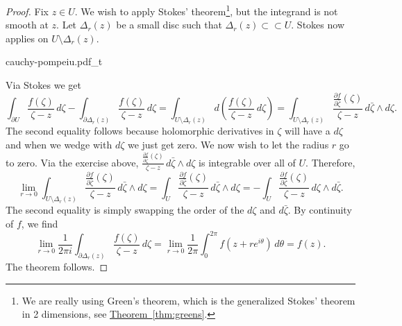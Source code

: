 \documentclass[12pt,openany]{book}
\theoremstyle{plain}
\theoremstyle{remark}
\theoremstyle{definition}
\newenvironment{myfig}{%
    \begin{center}
}{%
    \end{center}
}
\theoremstyle{exercise}
\theoremstyle{example}
\newcommand{\thmref}[1]{\hyperref[#1]{Theorem~\ref*{#1}}}
\begin{document}
\begin{proof}
Fix $z \in U$.  We wish to apply Stokes' theorem\footnote{%
We are really using Green's theorem, which is the generalized
Stokes' theorem in 2 dimensions, see \thmref{thm:greens}.},
but the integrand is not smooth at $z$.
Let $\Delta_r(z)$ be a small disc such that
$\Delta_r(z) \subset
\subset U$.  Stokes now applies on $U \setminus \Delta_r(z)$.

\begin{myfig}
{cauchy-pompeiu.pdf_t}
\end{myfig}

Via Stokes we get
\begin{equation*}
\int_{\partial U} \frac{f(\zeta)}{\zeta-z}\,  d\zeta - 
\int_{\partial \Delta_r(z)} \frac{f(\zeta)}{\zeta-z}\,  d\zeta
=
\int_{U \setminus \Delta_r(z)} d\left( \frac{f(\zeta)}{\zeta-z} \, d\zeta \right)
=
\int_{U \setminus \Delta_r(z)} \frac{\frac{\partial f}{\partial
\bar{\zeta}}(\zeta)}{\zeta-z} \, d\bar{\zeta} \wedge d\zeta .
\end{equation*}
The second equality follows because holomorphic derivatives in $\zeta$
will have a $d\zeta$ and when we wedge with $d\zeta$ we just get zero.
We now wish to let the radius $r$ go to zero.
Via the exercise above,
$\frac{\frac{\partial f}{\partial \bar{\zeta}}(\zeta)}{\zeta-z} \, d\bar{\zeta} \wedge d\zeta$
is integrable over all of $U$.  Therefore,
\begin{equation*}
\lim_{r \to 0}
\int_{U \setminus \Delta_r(z)} \frac{\frac{\partial f}{\partial
\bar{\zeta}}(\zeta)}{\zeta-z} \, d\bar{\zeta} \wedge d\zeta
=
\int_{U} \frac{\frac{\partial f}{\partial
\bar{\zeta}}(\zeta)}{\zeta-z} \, d\bar{\zeta} \wedge d\zeta
=
-
\int_{U} \frac{\frac{\partial f}{\partial
\bar{\zeta}}(\zeta)}{\zeta-z} \, d\zeta \wedge d\bar{\zeta} .
\end{equation*}
The second equality is simply swapping the order of the $d\zeta$ and
$d\bar{\zeta}$.
By continuity of $f$, we find
\begin{equation*}
\lim_{r \to 0}
\frac{1}{2\pi i}
\int_{\partial \Delta_r(z)} \frac{f(\zeta)}{\zeta-z}\,  d\zeta
=
\lim_{r \to 0}
\frac{1}{2\pi}
\int_0^{2\pi} f(z + r e^{i\theta})\, d\theta
=
f(z) .
\end{equation*}
The theorem follows.
\end{proof}
\end{document}
